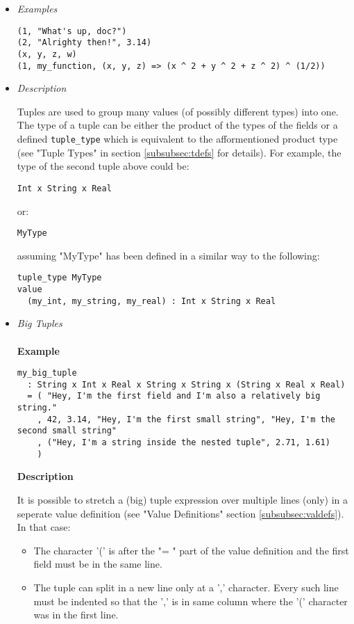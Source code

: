 \documentclass{article}
\begin{document}
\begin{itemize}

\item \textit{Examples}
\begin{verbatim}
(1, "What's up, doc?")
(2, "Alrighty then!", 3.14)
(x, y, z, w)
(1, my_function, (x, y, z) => (x ^ 2 + y ^ 2 + z ^ 2) ^ (1/2))
\end{verbatim}

\item \textit{Description} 

Tuples are used to group many values (of possibly different types) into one.
The type of a tuple can be either the product of the types of the fields or a
defined \texttt{tuple_type} which is equivalent to the afformentioned product
type (see "Tuple Types" in section \ref{subsubsec:tdefs} for details). For
example, the type of the second tuple above could be:
\begin{verbatim}
Int x String x Real
\end{verbatim}
or:
\begin{verbatim}
MyType
\end{verbatim}
assuming "MyType" has been defined in a similar way to the following:
\begin{verbatim}
tuple_type MyType
value
  (my_int, my_string, my_real) : Int x String x Real
\end{verbatim}

\item \textit{Big Tuples}
\\\\
\textbf{Example}
\begin{verbatim}
my_big_tuple
  : String x Int x Real x String x String x (String x Real x Real)
  = ( "Hey, I'm the first field and I'm also a relatively big string."
    , 42, 3.14, "Hey, I'm the first small string", "Hey, I'm the second small string"
    , ("Hey, I'm a string inside the nested tuple", 2.71, 1.61)
    )
\end{verbatim}

\textbf{Description}

It is possible to stretch a (big) tuple expression over multiple lines (only)
in a seperate value definition (see "Value Definitions" section
\ref{subsubsec:valdefs}).  In that case:
\begin{itemize}
\item
The character '(' is after the "= " part of the value definition
and the first field must be in the same line.

\item
The tuple can split in a new line only at a ',' character. Every such line must
be indented so that the ',' is in same column where the '(' character was in
the first line.


\end{itemize}
\end{itemize}
\end{document}
